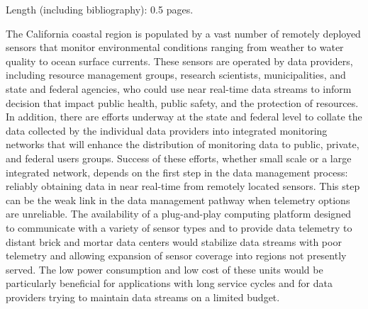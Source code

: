 \documentclass[conference]{IEEEtran}
\begin{document}
Length (including bibliography): 0.5 pages.

The California coastal region is populated by a vast number of
remotely deployed sensors that monitor environmental conditions
ranging from weather to water quality to ocean surface currents.
These sensors are operated by data providers, including resource
management groups, research scientists, municipalities, and state and
federal agencies, who could use near real-time data streams to inform
decision that impact public health, public safety, and the protection
of resources.  In addition, there are efforts underway at the state
and federal level to collate the data collected by the individual data
providers into integrated monitoring networks that will enhance the
distribution of monitoring data to public, private, and federal users
groups.  Success of these efforts, whether small scale or a large
integrated network, depends on the first step in the data management
process: reliably obtaining data in near real-time from remotely
located sensors.  This step can be the weak link in the data
management pathway when telemetry options are unreliable.  The
availability of a plug-and-play computing platform designed to
communicate with a variety of sensor types and to provide data
telemetry to distant brick and mortar data centers would stabilize
data streams with poor telemetry and allowing expansion of sensor
coverage into regions not presently served.  The low power consumption
and low cost of these units would be particularly beneficial for
applications with long service cycles and for data providers trying to
maintain data streams on a limited budget.

%
%
\end{document}
